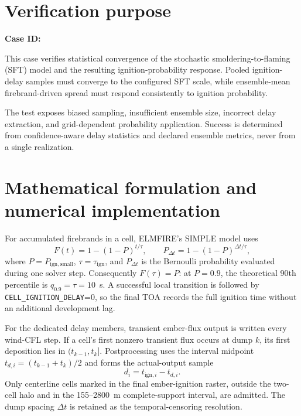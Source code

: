 \section{Verification purpose}

\textbf{Case ID:} \CaseID

This case verifies statistical convergence of the stochastic smoldering-to-flaming (SFT) model and the resulting ignition-probability response. Pooled ignition-delay samples must converge to the configured SFT scale, while ensemble-mean firebrand-driven spread must respond consistently to ignition probability.

The test exposes biased sampling, insufficient ensemble size, incorrect delay extraction, and grid-dependent probability application. Success is determined from confidence-aware delay statistics and declared ensemble metrics, never from a single realization.

\section{Mathematical formulation and numerical implementation}
For accumulated firebrands in a cell, ELMFIRE's SIMPLE model uses
\begin{equation}
 F(t)=1-(1-P)^{t/\tau}, \qquad
 P_{\Delta t}=1-(1-P)^{\Delta t/\tau},
 \label{eq:cdf}
\end{equation}
where $P=P_{\mathrm{ign,small}}$, $\tau=\tau_{\mathrm{ign}}$, and
$P_{\Delta t}$ is the Bernoulli probability evaluated during one solver step.
Consequently $F(\tau)=P$: at $P=0.9$, the theoretical 90th percentile is
$q_{0.9}=\tau=10$~s. A successful local transition is followed by
\texttt{CELL\_IGNITION\_DELAY}=0, so the final TOA records the full ignition
time without an additional development lag.

For the dedicated delay members, transient ember-flux output is written every
wind-CFL step. If a cell's first nonzero transient flux occurs at dump $k$, its
first deposition lies in $(t_{k-1},t_k]$. Postprocessing uses the interval
midpoint $t_{d,i}=(t_{k-1}+t_k)/2$ and forms the actual-output sample
\begin{equation}
 d_i=t_{\mathrm{ign},i}-t_{d,i}.
 \label{eq:delay}
\end{equation}
Only centerline cells marked in the final ember-ignition raster, outside the
two-cell halo and in the 155--2800~m complete-support interval, are admitted.
The dump spacing $\Delta t$ is retained as the temporal-censoring resolution.

